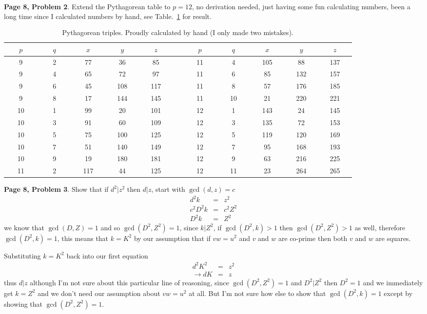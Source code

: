 \documentclass[aps,preprint,preprintnumbers,nofootinbib,showpacs,prd]{revtex4-1}
\newcommand{\nbea}{\begin{eqnarray*}}
\newcommand{\neea}{\end{eqnarray*}}
\begin{document}
{\bf Page 8, Problem 2}. Extend the Pythagorean table to $p = 12$, no derivation needed, just having some fun calculating numbers, been a long time since I calculated numbers by hand, see Table.~\ref{Tab:-1} for result.
%
\begin{table}[]
\centering
\caption{Pythagorean triples. Proudly calculated by hand (I only made two mistakes).}
\label{Tab:-1}
\begin{tabular}{|c|c|c|c|c|c|c|c|c|c|c|}
\hline
~~~$p$~~~ & ~~~$q$~~~ & ~~~$x$~~~ & ~~~$y$~~~ & ~~~$z$~~~ & &~~~$p$~~~ & ~~~$q$~~~ & ~~~$x$~~~ & ~~~$y$~~~ & ~~~$z$~~~  \\ \hline 
9 & 2 & 77 & 36 & 85 & ~ & 11 & 4 & 105 & 88 & 137 \\
9 & 4 & 65 & 72 & 97 & ~ &11 & 6 & 85 & 132 & 157 \\
9 & 6 & 45 & 108 & 117 & ~ & 11 & 8 & 57 & 176 & 185 \\
9 & 8 & 17 & 144 & 145 & ~ & 11 & 10 & 21 & 220 & 221 \\
10 & 1 & 99 & 20 & 101 & ~ & 12 & 1 & 143 & 24 & 145 \\
10 & 3 & 91 & 60 & 109 & ~ & 12 & 3 & 135 & 72 & 153 \\
10 & 5 & 75 & 100 & 125 & ~ & 12 & 5 & 119 & 120 & 169 \\
10 & 7 & 51 & 140 & 149 & ~ & 12 & 7 & 95 & 168 & 193 \\
10 & 9 & 19 & 180 & 181 & ~ & 12 & 9 & 63 & 216 & 225 \\
11 & 2 & 117 & 44 & 125 & ~ & 12 & 11 & 23 & 264 & 265 \\
\hline
\end{tabular}
\end{table}
%

{\bf Page 8, Problem 3}. Show that if $d^2|z^2$ then $d|z$, start with $\gcd(d,z) = c$
%
\nbea
d^2 k & = & z^2 \\
c^2 D^2 k & = & c^2 Z^2 \\
D^2 k & = & Z^2
\neea
%
we know that $\gcd(D,Z) = 1$ and so $\gcd(D^2,Z^2) = 1$, since $k|Z^2$, if $\gcd(D^2,k) > 1$ then $\gcd(D^2,Z^2) > 1$ as well, therefore $\gcd(D^2,k) = 1$, this means that $k = K^2$ by our assumption that if $vw = u^2$ and $v$ and $w$ are co-prime then both $v$ and $w$ are squares.

Substituting $k=K^2$ back into our first equation
%
\nbea
d^2K^2 & = & z^2 \\
\to dK & = & z
\neea
%
thus $d|z$ although I'm not sure about this particular line of reasoning, since $\gcd(D^2,Z^2) = 1$ and $D^2|Z^2$ then $D^2 = 1$ and we immediately get $k=Z^2$ and we don't need our assumption about $vw=u^2$ at all. But I'm not sure how else to show that $\gcd(D^2,k) = 1$ except by showing that $\gcd(D^2,Z^2) = 1$.
\end{document}
